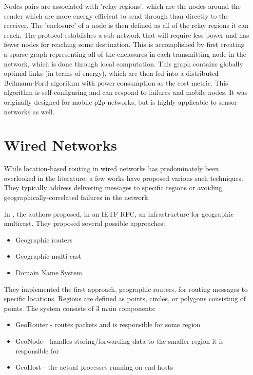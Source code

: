 \documentclass[conference]{IEEEtran}
\begin{document}
\cite{Rodoplu} Nodes pairs are associated with 'relay regions', which are the nodes around the sender which are more energy efficient to send through than directly to the receiver.  The 'enclosure' of a node is then defined as all of the relay regions it can reach.  The protocol establishes a sub-network that will require less power and has fewer nodes for reaching some destination.  This is accomplished by first creating a sparse graph representing all of the enclosures in each transmitting node in the network, which is done through local computation.  This graph contains globally optimal links (in terms of energy), which are then fed into a distributed Bellmann-Ford algorithm with power consumption as the cost metric.  This algorithm is self-configuring and can respond to failures and mobile nodes.  It was originally designed for mobile p2p networks, but is highly applicable to sensor networks as well.


\section{Wired Networks}

While location-based routing in wired networks has predominately been overlooked in the literature, a few works have proposed various such techniques.
They typically address delivering messages to specific regions or avoiding geographically-correlated failures in the network.

In \cite{Navas1997}, the authors proposed, in an IETF RFC, an infrastructure for geographic multicast.
They proposed several possible approaches:
\begin{itemize}
\item Geographic routers
\item Geographic multi-cast
\item Domain Name System
\end{itemize}

They implemented the first approach, geographic routers, for routing messages to specific locations.
Regions are defined as points, circles, or polygons consisting of points.
The system consists of 3 main components:
\begin{itemize}
\item GeoRouter - routes packets and is responsible for some region
\item GeoNode - handles storing/forwarding data to the smaller region it is responsible for
\item GeoHost - the actual processes running on end hosts 
\end{itemize}
\end{document}
